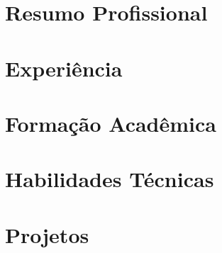 \documentclass[11pt,a4paper,sans]{moderncv}
\begin{document}
\makecvtitle

\section{Resumo Profissional}


\section{Experiência}


\section{Formação Acadêmica}


\section{Habilidades Técnicas}


\section{Projetos}


%
\end{document}
